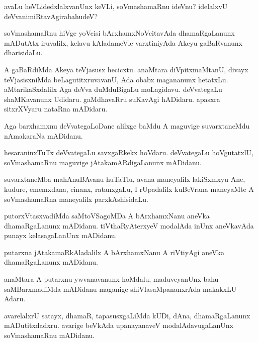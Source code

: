 \documentclass{article}
\begin{document}
\begin{mn}
avaLu heVLidedxlalxvanUnx keVLi,  soVmashamaRnu  ideVnu?  idelalxvU deVvanimiRtavAgirabahudeV?
\end{mn}

\begin{mn}
soVmashamaRnu hiVge yoVcisi bArxhamxNoVcitavAda  dhamaRgaLanunx mADutAtx 
iruvalilx, kelavu kAladameVle varxtiniyAda Akeyu gaBaRvanunx dharisidaLu.
\end{mn}

\begin{mn}
A gaBaRdiMda Akeya teVjasusx hecicxtu.  anaMtara diVpitxmaMtanU, divayx 
teVjasisxniMda beLagutitxruvavanU, Ada obabx magananunx hetatxLu.  
aMtarikaSxdalilx Aga deVva duMduBigaLu moLagidavu. deVvategaLu  shaMKavanunx 
Udidaru.  gaMdhavaRru  suKavAgi hADidaru.  apasxra sitxrXVyaru nataRna mADidaru.
\end{mn}

\begin{mn}
Aga barxhamxnu deVvategaLoDane alilxge baMdu A maguvige suvarxtaneMdu nAmakaraNa mADidanu.
\end{mn}

\begin{mn}
hesaraninxTuTx deVvategaLu savxgaRkekx hoVdaru. deVvategaLu hoVgutatxlU, 
soVmashamaRnu maguvige jAtakamARdigaLanunx mADidanu.
\end{mn}

\begin{mn}
suvarxtaneMba mahAnuBAvanu huTaTlu, avana maneyalilx lakiSxmxyu Ane, kudure, 
ememxdana, cinanx, ratanxgaLu, I rUpadalilx kuBeVrana maneyaMte 
A soVmashamaRna maneyalilx parxkAshisidaLu.
\end{mn}

\begin{mn}
putorxVtasxvadiMda saMtoVSagoMDa A bArxhamxNanu aneVka dhamaRgaLanunx mADidanu. 
tiVthaRyAterxyeV modalAda inUnx aneVkavAda punayx kelasagaLanUnx mADidanu.
\end{mn}

\begin{mn}
putarxna jAtakamaRkAladalilx A bArxhamxNanu A riVtiyAgi aneVka dhamaRgaLanunx mADidanu.
\end{mn}

\begin{mn}
anaMtara A putarxnu ywvanavanunx hoMdalu, maduveyanUnx bahu saMBarxmadiMda 
mADidanu maganige shiVlasaMpananxrAda makakxLU Adaru.
\end{mn}

\begin{mn}
avarelalxrU satayx, dhamaR, tapasusxgaLiMda kUDi, dAna, dhamaRgaLanunx 
mADutitxdadxru.  avarige beVkAda upanayanaveV modalAdavugaLanUnx soVmashamaRnu mADidanu.
\end{mn}
\end{document}
